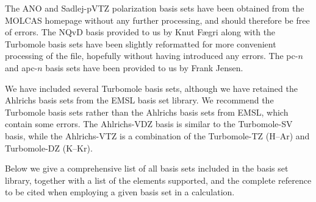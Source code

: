 The ANO and Sadlej-pVTZ polarization basis sets have been obtained from the
MOLCAS homepage without any further processing, and should therefore
be free of errors. The NQvD basis provided to us by Knut F\ae gri 
along with the Turbomole basis sets have been slightly reformatted for more 
convenient processing of the file, hopefully without having introduced any errors. 
The pc-$n$ and apc-$n$ basis sets have been provided to us by Frank Jensen.

We have included several Turbomole basis sets,
although we have retained the Ahlrichs basis sets
from the EMSL basis set library. We recommend the Turbomole
basis sets rather than the Ahlrichs basis sets from EMSL, which
contain some errors. The Ahlrichs-VDZ basis
is similar to the Turbomole-SV basis, while the Ahlrichs-VTZ is a
combination of the Turbomole-TZ (H--Ar) and Turbomole-DZ (K--Kr).

Below we give a comprehensive list of all basis sets included in 
the basis set library, together with 
a list of the elements supported, and the complete reference to be 
cited when employing a given basis set in a calculation. 

